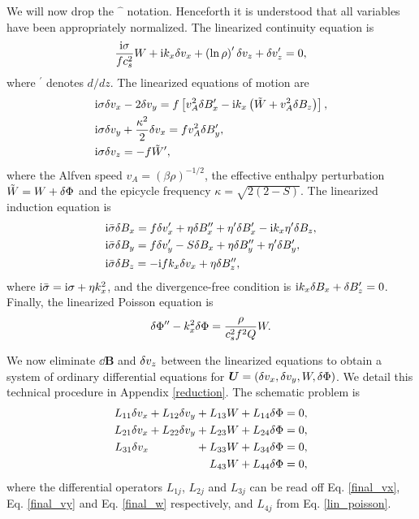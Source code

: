 We will now drop the $\hat{\phantom{a}}$ notation. Henceforth it is
understood that all variables have been appropriately normalized. The
linearized continuity equation is 
\begin{align}
  \frac{\mathrm{i}\sigma}{fc_s^2}W + \mathrm{i} k_x \delta v_x
  +\left(\ln\rho\right)^\prime\delta v_z + \delta v_z^\prime = 0,\label{lin_cont}
\end{align}
where $^\prime$ denotes $d/dz$. The linearized equations of motion are
\begin{align}
  &\mathrm{i}\sigma \delta v_x - 2\delta v_y = f\left[v_A^2\delta B_x^\prime - \mathrm{i} k_x
    \left(\tilde{W} + v_A^2\delta B_z
    \right)\right],\\
  &\mathrm{i}\sigma\delta v_y + \frac{\kappa^2}{2}\delta v_x = fv_A^2\delta B_y^\prime,\\
  & \mathrm{i}\sigma\delta v_z = -f\tilde{W}^\prime,
\end{align}
where the Alfven speed $v_A =
\left(\beta\rho\right)^{-1/2}$, the effective enthalpy perturbation
$\tilde{W} = W + \delta \Phi$ and the epicycle frequency $\kappa=\sqrt{2(2-S)}$. 
The linearized induction equation is
\begin{align}
&  \mathrm{i}\bar{\sigma}\delta B_x = f\delta v_x^\prime +
  \eta\delta B_x^{\prime\prime}+\eta^\prime\delta B_x^\prime - \mathrm{i} k_x
  \eta^\prime \delta B_z,\label{induct_x}\\
&\mathrm{i}\bar{\sigma}\delta B_y = f\delta v_y^\prime - S\delta B_x +
  \eta\delta B_y^{\prime\prime}+\eta^\prime\delta B_y^\prime,\label{induct_y}\\
& \mathrm{i}\bar{\sigma}\delta B_z = -\mathrm{i} f k_x \delta v_x + \eta\delta B_z^{\prime\prime}, \label{induct_vert}
\end{align}
where $\mathrm{i}\bar{\sigma} = \mathrm{i}\sigma + \eta k_x^2$, and the
divergence-free condition is $\mathrm{i} k_x\delta B_x + \delta B_z^\prime=0$. Finally,
the linearized Poisson equation is
\begin{align}
  \delta \Phi^{\prime\prime} - k_x^2\delta \Phi = \frac{\rho}{c_s^2f^2Q}W.  \label{lin_poisson}
\end{align}

We now eliminate $\dd\bm{B}$ and $\delta v_z$ between the linearized
equations to obtain a system of ordinary differential equations for
$\bm{U}=\left(\delta v_x,\delta v_y,W,\delta \Phi\right)$. We detail this technical
procedure in Appendix \ref{reduction}. The schematic problem is
\begin{align}
  L_{11}\dvx + L_{12}\dvy + L_{13}W + L_{14}\dphi &= 0, \label{lin1}\\
  L_{21}\dvx + L_{22}\dvy + L_{23}W + L_{24}\dphi &= 0, \label{lin2}\\
  L_{31}\dvx \quad\quad\quad\,\,\,\,\,\,\, + L_{33}W + L_{34}\dphi &=0,\label{lin3}\\
  \phantom{L_{31}\dvx + L_{22}\dvy +} L_{43}W + L_{44}\dphi
  &=0\label{lin4}, 
\end{align}
where the differential operators $L_{1j}$, $L_{2j}$ and $L_{3j}$ can
be read off Eq. \ref{final_vx}, Eq. \ref{final_vy} and 
Eq. \ref{final_w} respectively, and $L_{4j}$ from
Eq. \ref{lin_poisson}. 

